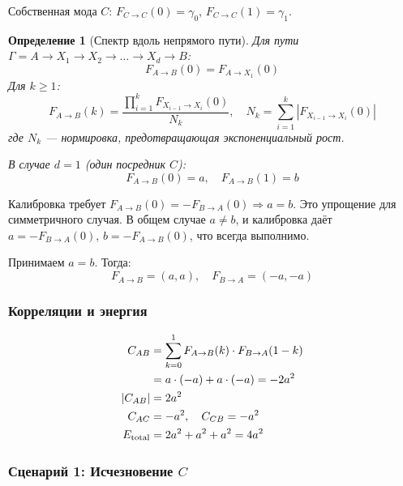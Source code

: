 \documentclass[12pt,a4paper]{article}
\newtheorem{definition}{Определение}[section]
\begin{document}
Собственная мода $C$: $F_{C \to C}(0) = \gamma_0$, $F_{C \to C}(1) = \gamma_1$.

\begin{definition}[Спектр вдоль непрямого пути]
Для пути $\Gamma = A \to X_1 \to X_2 \to \dots \to X_d \to B$:
\begin{equation}
    F_{A \to B}(0) = F_{A \to X_1}(0)
\end{equation}
Для $k \geq 1$:
\begin{equation}
    F_{A \to B}(k) = \frac{\prod_{i=1}^{k} F_{X_{i-1} \to X_i}(0)}{N_k}, \quad N_k = \sum_{i=1}^{k} |F_{X_{i-1} \to X_i}(0)|
\end{equation}
где $N_k$ --- нормировка, предотвращающая экспоненциальный рост.

В случае $d=1$ (один посредник $C$):
\begin{equation}
    F_{A \to B}(0) = a, \quad F_{A \to B}(1) = b
\end{equation}
\end{definition}

Калибровка требует $F_{A \to B}(0) = -F_{B \to A}(0) \Rightarrow a = b$. Это упрощение для симметричного случая. В общем случае $a \neq b$, и калибровка даёт $a = -F_{B \to A}(0)$, $b = -F_{A \to B}(0)$, что всегда выполнимо.

Принимаем $a = b$. Тогда:
\begin{equation}
    F_{A \to B} = (a, a), \quad F_{B \to A} = (-a, -a)
\end{equation}

\subsubsection{Корреляции и энергия}

\begin{align}
    C_{AB} &= \sum_{k=0}^{1} F_{A \to B}(k) \cdot F_{B \to A}(1-k) \notag\\
           &= a \cdot (-a) + a \cdot (-a) = -2a^2 \\
    |C_{AB}| &= 2a^2 \\
    C_{AC} &= -a^2, \quad C_{CB} = -a^2 \\
    E_{\text{total}} &= 2a^2 + a^2 + a^2 = 4a^2
\end{align}

\subsubsection{Сценарий 1: Исчезновение $C$}
\end{document}
